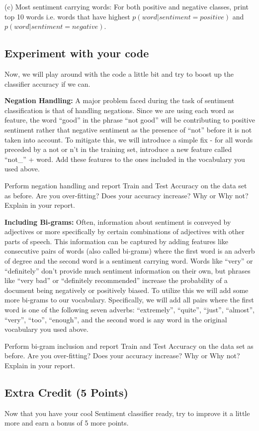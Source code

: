 (c) Most sentiment carrying words: For both positive and negative classes, print top 10 words i.e. words that have highest $p(word|sentiment=positive)$ and $p(word|sentiment=negative)$.

\subsection{Experiment with your code}
Now, we will play around with the code a little bit and try to boost up the classifier accuracy if we can.

{\bf Negation Handling:}
A major problem faced during the task of sentiment classification is that of handling negations. Since we are using each word as feature, the word ``good'' in the phrase ``not good'' will be contributing to positive sentiment rather that negative sentiment as the presence of ``not'' before it is not taken into account. To mitigate this, we will introduce a simple fix - for all words preceded by a not or n't in the training set, introduce a new feature called
``not\_'' + word. Add these features to the ones included in the vocabulary you used above.

Perform negation handling and report Train and Test Accuracy on the data set as before. Are you over-fitting? Does your accuracy increase? Why or Why not? Explain in your report.

{\bf Including Bi-grams:}
Often, information about sentiment is conveyed by adjectives or more specifically by certain combinations of adjectives with other parts of speech. This information can be captured by adding features like consecutive pairs of words (also called bi-grams) where the first word is an adverb of degree and the second word is a sentiment carrying word. Words like ``very'' or ``definitely'' don't provide much sentiment information on their own, but phrases like ``very bad'' or ``definitely recommended'' increase the probability of a document being negatively or positively biased. To utilize this we will add some more bi-grams to our vocabulary. Specifically, we will add all pairs where the first word is one of the following seven adverbs: ``extremely'', ``quite'', ``just'', ``almost'', ``very'', ``too'', ``enough'', and the second word is any word in the original vocabulary  you used above.

Perform bi-gram inclusion and report Train and Test Accuracy on the data set as before. Are you over-fitting? Does your accuracy increase? Why or Why not? Explain in your report.

\subsection{Extra Credit (5 Points)}
Now that you have your cool Sentiment classifier ready, try to improve it a little more and earn a bonus of 5 more points.

